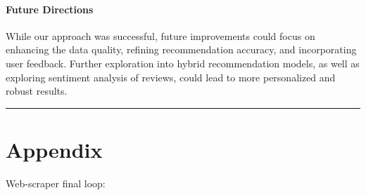 \documentclass[
]{article}
\begin{document}
\paragraph{Future Directions}\label{future-directions}

While our approach was successful, future improvements could focus on
enhancing the data quality, refining recommendation accuracy, and
incorporating user feedback. Further exploration into hybrid
recommendation models, as well as exploring sentiment analysis of
reviews, could lead to more personalized and robust results.

\begin{center}\rule{0.5\linewidth}{0.5pt}\end{center}

\section{Appendix}\label{appendix}

Web-scraper final loop:
\end{document}
